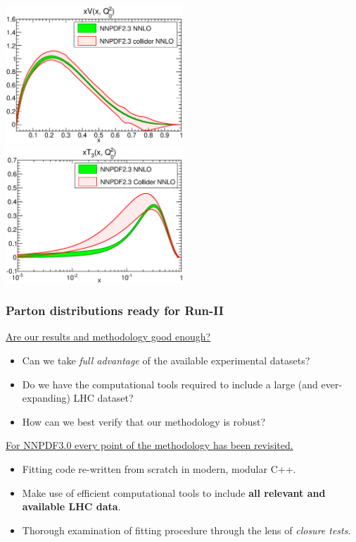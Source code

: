 \documentclass[10pt]{beamer}
\begin{document}
\begin{frame}
\begin{center}
\includegraphics[width=0.50\textwidth]{figures/xV_Q_2_lin-23-vs-23coll-nnlo.eps}
\includegraphics[width=0.50\textwidth]{figures/xT3_Q_2_log-23-vs-23coll-nnlo.eps}\\
\end{center}
\end{frame}

\begin{frame}
\frametitle{Parton distributions ready for Run-II}
\underline{Are our results and methodology good enough?}

\begin{itemize}
\item Can we take \emph{full advantage} of the available experimental datasets?
\item Do we have the computational tools required to include a large (and ever-expanding) LHC dataset?
\item How can we best verify that our methodology is robust?
\end{itemize}
\vskip15pt
\underline{For NNPDF3.0 every point of the methodology has been revisited.}

\begin{itemize}
\item Fitting code re-written from scratch in modern, modular C++.
\item Make use of efficient computational tools to include \textbf{all relevant and available LHC data}.
\item Thorough examination of fitting procedure through the lens of \emph{closure tests}.
\end{itemize}
\end{frame}
\end{document}
